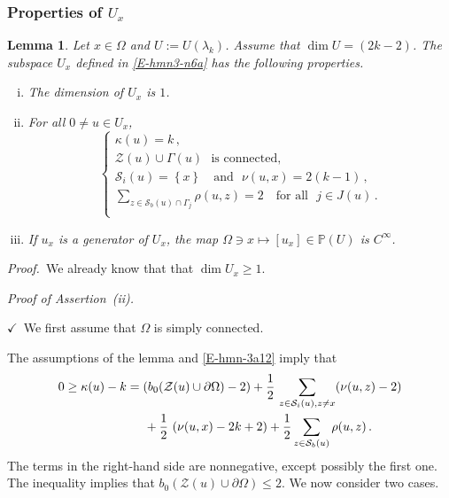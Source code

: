 \documentclass[12pt,a4paper]{amsart}
\theoremstyle{plain} %
\newtheorem{lemma}[theorem]{Lemma}
\theoremstyle{definition}
\numberwithin{equation}{section}
\numberwithin{figure}{section}
\numberwithin{table}{section}
\newcommand{\bP}{\mathbb{P}}
\newcommand{\cS}{\mathcal{S}}
\newcommand{\cZ}{\mathcal{Z}}
\newcommand{\pf}{\emph{Proof.~}}
\newcommand{\set}[1]{\left\lbrace #1 \right\rbrace}
\newcommand{\noih}{\noindent $\checkmark$~}
\begin{document}
\subsubsection{Properties of $U_x$}\label{SSS-hmn-31ia}

\begin{lemma}\label{L-L37}
Let $x \in \Omega$ and $U := U(\lambda_k)$. Assume that $\dim U = (2k-2)$.  The subspace $U_x$ defined in \eqref{E-hmn3-n6a} has the following properties.
\begin{enumerate}[(i)]
  \item  The dimension of $U_x$ is $1$.
  \item For all $0 \neq u \in U_x$,
  \begin{equation}\label{E-hmn3-n6b}
  \left\{
\begin{array}{l}
\kappa(u) = k\,,\\[5pt]
\cZ(u) \cup \Gamma(u) \text{~~is connected,}\\[5pt]
\cS_i(u) = \set{x} \quad\text{and~~} \nu(u,x) = 2(k -1)\,,\\[5pt]
\sum_{z \in \cS_b(u)\cap \Gamma_j} \rho(u,z) = 2 \quad \text{for all~~} j \in J(u)\,.\\[5pt]
\end{array}
\right.
  \end{equation}
\item If $u_x$ is a generator of $U_x$, the map $\Omega \ni x \mapsto [u_x] \in \bP(U)$ is $C^{\infty}$.
\end{enumerate}%
\end{lemma}


\pf  We already know that that $\dim U_x \ge 1$. \smallskip

\emph{Proof of Assertion~(ii).}

\noih We first assume that $\Omega$ is simply connected.\smallskip

The assumptions of the lemma and \eqref{E-hmn-3a12} imply that
%
\begin{equation}\label{E-hmn-312}
\begin{split}
0 \geq  \kappa(u) - k & = \left( b_0(\cZ(u) \cup \partial \Omega) -2\right) + \frac 12\, \sum_{z \in \cS_i(u), z\neq x } (\nu(u,z)-2) \\
&\hspace{5mm} + \frac 12 \, \left( \nu(u,x) - 2k +2\right)  + \frac 12 \sum_{z\in \cS_b(u) }\rho (u,z) \,.
\end{split}
\end{equation}
%
The terms in the right-hand side are nonnegative, except possibly the first one. The inequality implies that $b_0(\cZ(u) \cup \partial\Omega) \le 2$. We now consider two cases.\smallskip
\end{document}
